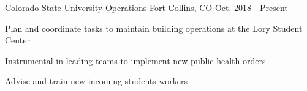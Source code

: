 \begin{cventries}
  \cventry
    {Colorado State University} %
    {Operations} %
    {Fort Collins, CO} %
    {Oct. 2018 - Present} %
    {
      \begin{cvitems} %
        \item {Plan and coordinate tasks to maintain building operations at the Lory Student Center}
        \item {Instrumental in leading teams to implement new public health orders}
        \item{Advise and train new incoming students workers}
      \end{cvitems}
    }

\end{cventries}
